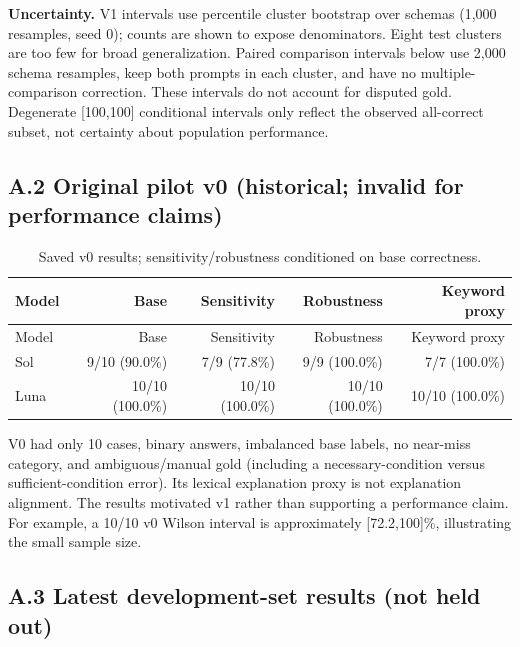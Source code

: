 \textbf{Uncertainty.} V1 intervals use percentile cluster bootstrap over schemas (1,000 resamples, seed 0); counts are shown to expose denominators. Eight test clusters are too few for broad generalization. Paired comparison intervals below use 2,000 schema resamples, keep both prompts in each cluster, and have no multiple-comparison correction. These intervals do not account for disputed gold. Degenerate [100,100] conditional intervals only reflect the observed all-correct subset, not certainty about population performance.

\subsection*{A.2 Original pilot v0 (historical; invalid for performance claims)}

\begingroup\small\setlength{\tabcolsep}{4pt}
\begin{longtable}{lrrrr}
\caption{Saved v0 results; sensitivity/robustness conditioned on base correctness.}\\
\toprule
Model & Base & Sensitivity & Robustness & Keyword proxy \\
\midrule\endfirsthead
\toprule
Model & Base & Sensitivity & Robustness & Keyword proxy \\
\midrule\endhead
\bottomrule\endfoot
Sol & 9/10 (90.0\%) & 7/9 (77.8\%) & 9/9 (100.0\%) & 7/7 (100.0\%) \\
Luna & 10/10 (100.0\%) & 10/10 (100.0\%) & 10/10 (100.0\%) & 10/10 (100.0\%) \\
\end{longtable}\endgroup


V0 had only 10 cases, binary answers, imbalanced base labels, no near-miss category, and ambiguous/manual gold (including a necessary-condition versus sufficient-condition error). Its lexical explanation proxy is not explanation alignment. The results motivated v1 rather than supporting a performance claim. For example, a 10/10 v0 Wilson interval is approximately [72.2,100]\%, illustrating the small sample size.

\subsection*{A.3 Latest development-set results (not held out)}

